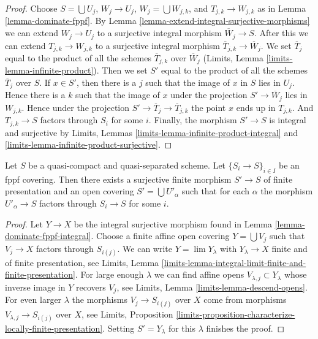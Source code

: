 \begin{proof}
Choose $S = \bigcup U_j$, $W_j \to U_j$, $W_j = \bigcup W_{j, k}$, and
$T_{j, k} \to W_{j, k}$ as in Lemma \ref{lemma-dominate-fppf}.
By Lemma \ref{lemma-extend-integral-surjective-morphisms}
we can extend $W_j \to U_j$ to a surjective integral
morphism $\overline{W}_j \to S$.
After this we can extend $T_{j, k} \to W_{j, k}$ to a surjective
integral morphism $\overline{T}_{j, k} \to \overline{W}_j$.
We set $\overline{T}_j$ equal to the product of all the schemes
$\overline{T}_{j, k}$ over $\overline{W}_j$
(Limits, Lemma \ref{limits-lemma-infinite-product}).
Then we set $S'$ equal to the product of all the schemes
$\overline{T}_j$ over $S$.
If $x \in S'$, then there is a $j$ such that the image of $x$ in
$S$ lies in $U_j$. Hence there is a $k$ such that the image of
$x$ under the projection $S' \to \overline{W}_j$ lies in $W_{j, k}$.
Hence under the projection $S' \to \overline{T}_j \to \overline{T}_{j, k}$
the point $x$ ends up in $T_{j, k}$. And $T_{j, k} \to S$
factors through $S_i$ for some $i$.
Finally, the morphism $S' \to S$ is integral and surjective
by Limits, Lemmas \ref{limits-lemma-infinite-product-integral} and
\ref{limits-lemma-infinite-product-surjective}.
\end{proof}

\begin{lemma}
\label{lemma-dominate-fppf-finite}
Let $S$ be a quasi-compact and quasi-separated scheme.
Let $\{S_i \to S\}_{i \in I}$ be an fppf covering.
Then there exists a surjective finite morphism $S' \to S$
of finite presentation and an
open covering $S' = \bigcup U'_\alpha$ such that for each $\alpha$ the
morphism $U'_\alpha \to S$ factors through $S_i \to S$ for some $i$.
\end{lemma}

\begin{proof}
Let $Y \to X$ be the integral surjective morphism found in
Lemma \ref{lemma-dominate-fppf-integral}.
Choose a finite affine open covering $Y = \bigcup V_j$
such that $V_j \to X$ factors through $S_{i(j)}$.
We can write $Y = \lim Y_\lambda$ with
$Y_\lambda \to X$ finite and of finite presentation, see
Limits, Lemma \ref{limits-lemma-integral-limit-finite-and-finite-presentation}.
For large enough $\lambda$ we can find affine opens
$V_{\lambda, j} \subset Y_\lambda$
whose inverse image in $Y$ recovers $V_j$, see
Limits, Lemma \ref{limits-lemma-descend-opens}.
For even larger $\lambda$ the morphisms $V_j \to S_{i(j)}$
over $X$ come from morphisms $V_{\lambda, j} \to S_{i(j)}$ over
$X$, see
Limits, Proposition
\ref{limits-proposition-characterize-locally-finite-presentation}.
Setting $S' = Y_\lambda$ for this $\lambda$ finishes the proof.
\end{proof}

